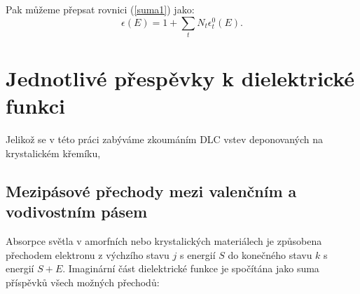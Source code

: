 Pak můžeme přepsat rovnici (\ref{suma1}) jako:
\begin{equation}
\epsilon (E) = 1 + \sum_t N_t \epsilon_t^0(E) \mathrm{.}
\end{equation}




\section{Jednotlivé přespěvky k dielektrické funkci}
Jelikož se v této práci zabýváme zkoumáním DLC vstev deponovaných na krystalickém křemíku, 




\subsection{Mezipásové přechody mezi valenčním a vodivostním pásem}

Absorpce světla v amorfních nebo krystalických materiálech je způsobena přechodem elektronu z výchzího stavu $j$ s energií $S$ do konečného stavu $k$ s energií $S + E$. Imaginární část dielektrické funkce je spočítána jako suma příspěvků všech možných přechodů:

